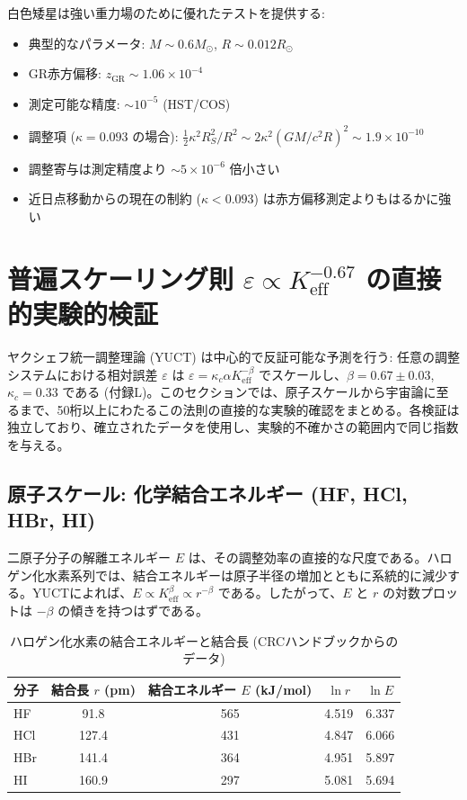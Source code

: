 \documentclass[11pt,a4paper]{article}
\begin{document}
	白色矮星は強い重力場のために優れたテストを提供する:
	\begin{itemize}
		\item 典型的なパラメータ: $M \sim 0.6 M_\odot$, $R \sim 0.012 R_\odot$
		\item GR赤方偏移: $z_{\text{GR}} \sim 1.06\times10^{-4}$
		\item 測定可能な精度: $\sim 10^{-5}$ (HST/COS)
		\item 調整項 ($\kappa = 0.093$ の場合): $\frac{1}{2}\kappa^2 R_S^2/R^2 \sim 2\kappa^2 (GM/c^2R)^2 \sim 1.9\times10^{-10}$
		\item 調整寄与は測定精度より $\sim 5\times10^{-6}$ 倍小さい
		\item 近日点移動からの現在の制約 ($\kappa < 0.093$) は赤方偏移測定よりもはるかに強い
	\end{itemize}
	
	\section{普遍スケーリング則 $\varepsilon \propto K_{\mathrm{eff}}^{-0.67}$ の直接的実験的検証}
	\label{sec:experimental-verifications}
	
	ヤクシェフ統一調整理論 (YUCT) は中心的で反証可能な予測を行う: 任意の調整システムにおける相対誤差 $\varepsilon$ は $\varepsilon = \kappa_c \alpha K_{\mathrm{eff}}^{-\beta}$ でスケールし、$\beta = 0.67 \pm 0.03$, $\kappa_c = 0.33$ である (付録L)。このセクションでは、原子スケールから宇宙論に至るまで、50桁以上にわたるこの法則の直接的な実験的確認をまとめる。各検証は独立しており、確立されたデータを使用し、実験的不確かさの範囲内で同じ指数を与える。
	
	\subsection{原子スケール: 化学結合エネルギー (HF, HCl, HBr, HI)}
	\label{subsec:chem-bonds}
	
	二原子分子の解離エネルギー $E$ は、その調整効率の直接的な尺度である。ハロゲン化水素系列では、結合エネルギーは原子半径の増加とともに系統的に減少する。YUCTによれば、$E \propto K_{\mathrm{eff}}^{\beta} \propto r^{-\beta}$ である。したがって、$E$ と $r$ の対数プロットは $-\beta$ の傾きを持つはずである。
	
	\begin{table}[htbp]
		\centering
		\caption{ハロゲン化水素の結合エネルギーと結合長 (CRCハンドブックからのデータ)}
		\label{tab:bond-data}
	
			\begin{tabular}{lcccc}
				\toprule
				分子 & 結合長 $r$ (pm) & 結合エネルギー $E$ (kJ/mol) & $\ln r$ & $\ln E$ \\
				\midrule
				HF   & 91.8 & 565 & 4.519 & 6.337 \\
				HCl  & 127.4 & 431 & 4.847 & 6.066 \\
				HBr  & 141.4 & 364 & 4.951 & 5.897 \\
				HI   & 160.9 & 297 & 5.081 & 5.694 \\
				\bottomrule
			\end{tabular}
	
	\end{table}
	
\end{document}
